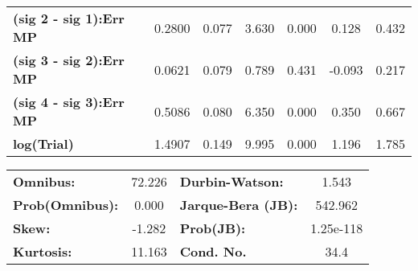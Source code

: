 \begin{center}
\begin{tabular}{lcccccc}
\textbf{(sig 2 - sig 1):Err MP} &       0.2800  &        0.077     &     3.630  &         0.000        &        0.128    &        0.432     \\
\textbf{(sig 3 - sig 2):Err MP} &       0.0621  &        0.079     &     0.789  &         0.431        &       -0.093    &        0.217     \\
\textbf{(sig 4 - sig 3):Err MP} &       0.5086  &        0.080     &     6.350  &         0.000        &        0.350    &        0.667     \\
\textbf{log(Trial)}             &       1.4907  &        0.149     &     9.995  &         0.000        &        1.196    &        1.785     \\
\bottomrule
\end{tabular}
\end{center}\begin{center}
\begin{tabular}{lclc}
\toprule
\textbf{Omnibus:}       & 72.226 & \textbf{  Durbin-Watson:     } &     1.543  \\
\textbf{Prob(Omnibus):} &  0.000 & \textbf{  Jarque-Bera (JB):  } &   542.962  \\
\textbf{Skew:}          & -1.282 & \textbf{  Prob(JB):          } & 1.25e-118  \\
\textbf{Kurtosis:}      & 11.163 & \textbf{  Cond. No.          } &      34.4  \\
\bottomrule
\end{tabular}
\end{center}



